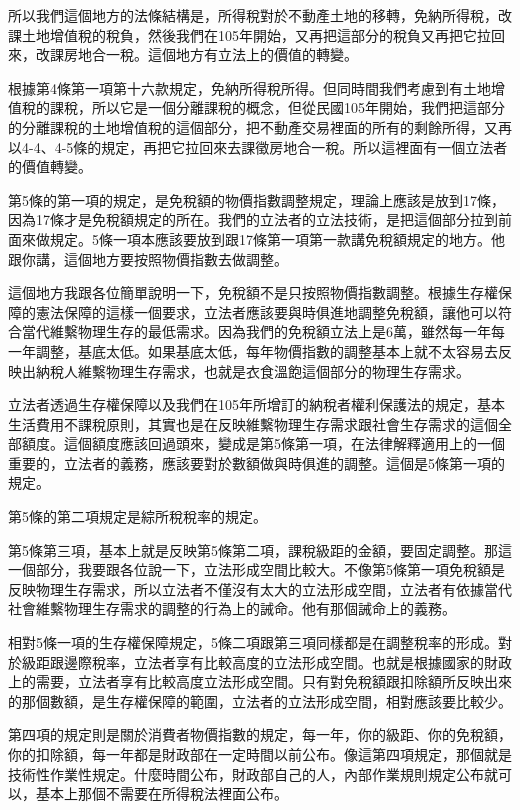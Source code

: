 \documentclass[oneside,sub3section]{ctexbook}
\begin{document}
所以我們這個地方的法條結構是，所得稅對於不動產土地的移轉，免納所得稅，改課土地增值稅的稅負，然後我們在105年開始，又再把這部分的稅負又再把它拉回來，改課房地合一稅。這個地方有立法上的價值的轉變。

根據第4條第一項第十六款規定，免納所得稅所得。但同時間我們考慮到有土地增值稅的課稅，所以它是一個分離課稅的概念，但從民國105年開始，我們把這部分的分離課稅的土地增值稅的這個部分，把不動產交易裡面的所有的剩餘所得，又再以4-4、4-5條的規定，再把它拉回來去課徵房地合一稅。所以這裡面有一個立法者的價值轉變。

第5條的第一項的規定，是免稅額的物價指數調整規定，理論上應該是放到17條，因為17條才是免稅額規定的所在。我們的立法者的立法技術，是把這個部分拉到前面來做規定。5條一項本應該要放到跟17條第一項第一款講免稅額規定的地方。他跟你講，這個地方要按照物價指數去做調整。

這個地方我跟各位簡單說明一下，免稅額不是只按照物價指數調整。根據生存權保障的憲法保障的這樣一個要求，立法者應該要與時俱進地調整免稅額，讓他可以符合當代維繫物理生存的最低需求。因為我們的免稅額立法上是6萬，雖然每一年每一年調整，基底太低。如果基底太低，每年物價指數的調整基本上就不太容易去反映出納稅人維繫物理生存需求，也就是衣食溫飽這個部分的物理生存需求。

立法者透過生存權保障以及我們在105年所增訂的納稅者權利保護法的規定，基本生活費用不課稅原則，其實也是在反映維繫物理生存需求跟社會生存需求的這個全部額度。這個額度應該回過頭來，變成是第5條第一項，在法律解釋適用上的一個重要的，立法者的義務，應該要對於數額做與時俱進的調整。這個是5條第一項的規定。

第5條的第二項規定是綜所稅稅率的規定。

第5條第三項，基本上就是反映第5條第二項，課稅級距的金額，要固定調整。那這一個部分，我要跟各位說一下，立法形成空間比較大。不像第5條第一項免稅額是反映物理生存需求，所以立法者不僅沒有太大的立法形成空間，立法者有依據當代社會維繫物理生存需求的調整的行為上的誡命。他有那個誡命上的義務。

相對5條一項的生存權保障規定，5條二項跟第三項同樣都是在調整稅率的形成。對於級距跟邊際稅率，立法者享有比較高度的立法形成空間。也就是根據國家的財政上的需要，立法者享有比較高度立法形成空間。只有對免稅額跟扣除額所反映出來的那個數額，是生存權保障的範圍，立法者的立法形成空間，相對應該要比較少。

第四項的規定則是關於消費者物價指數的規定，每一年，你的級距、你的免稅額，你的扣除額，每一年都是財政部在一定時間以前公布。像這第四項規定，那個就是技術性作業性規定。什麼時間公布，財政部自己的人，內部作業規則規定公布就可以，基本上那個不需要在所得稅法裡面公布。
\end{document}
